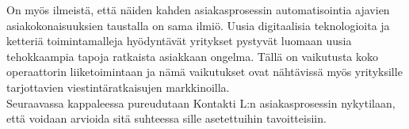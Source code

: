 \documentclass[finnish,12pt,a4paper,pdftex]{article}
\begin{document}
On myös ilmeistä, että näiden kahden asiakasprosessin automatisointia ajavien asiakokonaisuuksien taustalla on sama ilmiö. Uusia digitaalisia teknologioita ja ketteriä toimintamalleja hyödyntävät yritykset pystyvät luomaan uusia tehokkaampia tapoja ratkaista asiakkaan ongelma. Tällä on vaikutusta koko operaattorin liiketoimintaan ja nämä vaikutukset ovat nähtävissä myös yrityksille tarjottavien viestintäratkaisujen markkinoilla. \\

Seuraavassa kappaleessa pureudutaan Kontakti L:n asiakasprosessin nykytilaan, että voidaan arvioida sitä suhteessa sille asetettuihin tavoitteisiin.




\end{document}
